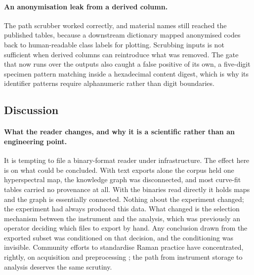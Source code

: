 \paragraph{An anonymisation leak from a derived column.}
The path scrubber worked correctly, and material names still reached the
published tables, because a downstream dictionary mapped anonymised codes back
to human-readable class labels for plotting. Scrubbing inputs is not sufficient
when derived columns can reintroduce what was removed. The gate that now runs
over the outputs also caught a false positive of its own, a five-digit specimen
pattern matching inside a hexadecimal content digest, which is why its
identifier patterns require alphanumeric rather than digit boundaries.


\subsection{Discussion}
\label{sec:discussion}

\paragraph{What the reader changes, and why it is a scientific rather than an
engineering point.}
It is tempting to file a binary-format reader under infrastructure. The effect
here is on what could be concluded. With text exports alone the corpus held one
hyperspectral map, the knowledge graph was disconnected, and most curve-fit
tables carried no provenance at all. With the binaries read directly it holds
\Nrawmap{} maps and the graph is essentially connected. Nothing about the
experiment changed; the experiment had always produced this data. What changed
is the selection mechanism between the instrument and the analysis, which was
previously an operator deciding which files to export by hand. Any conclusion
drawn from the exported subset was conditioned on that decision, and the
conditioning was invisible. Community efforts to standardise Raman practice
have concentrated, rightly, on acquisition and preprocessing
\cite{ntziouni2022review,barton2022chemometrics}; the path from instrument
storage to analysis deserves the same scrutiny.

